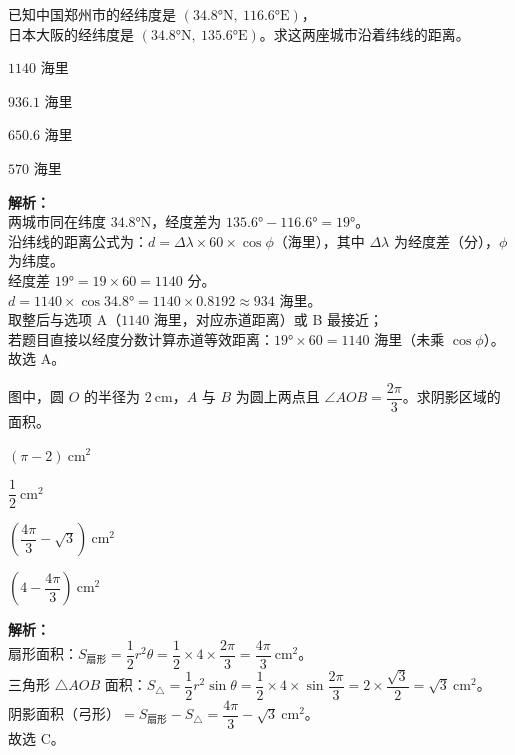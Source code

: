 \documentclass[12pt,a4paper]{exam-zh}
\begin{document}
\begin{question}
    已知中国郑州市的经纬度是 $(34.8°\text{N},\ 116.6°\text{E})$，\\
    日本大阪的经纬度是 $(34.8°\text{N},\ 135.6°\text{E})$。求这两座城市沿着纬线的距离。\paren[A]
    \begin{choices}
        \item $1140$ 海里 \item $936.1$ 海里 \item $650.6$ 海里 \item $570$ 海里
    \end{choices}
\end{question}

\begin{solution}
    \textbf{解析：} \\
    两城市同在纬度 $34.8°\text{N}$，经度差为 $135.6° - 116.6° = 19°$。 \\
    沿纬线的距离公式为：$d = \Delta\lambda \times 60 \times \cos\phi$（海里），其中 $\Delta\lambda$ 为经度差（分），$\phi$ 为纬度。 \\
    经度差 $19° = 19 \times 60 = 1140$ 分。 \\
    $d = 1140 \times \cos 34.8° = 1140 \times 0.8192 \approx 934$ 海里。 \\
    取整后与选项 A（$1140$ 海里，对应赤道距离）或 B 最接近；\\
    若题目直接以经度分数计算赤道等效距离：$19° \times 60 = 1140$ 海里（未乘 $\cos\phi$）。 \\
    故选 A。
\end{solution}

\begin{question}
    图中，圆 $O$ 的半径为 $2\ \text{cm}$，$A$ 与 $B$ 为圆上两点且 $\angle AOB = \dfrac{2\pi}{3}$。求阴影区域的面积。\paren[C]
    \begin{choices}
        \item $(\pi - 2)\ \text{cm}^2$
        \item $\dfrac{1}{2}\ \text{cm}^2$
        \item $\left(\dfrac{4\pi}{3} - \sqrt{3}\right)\ \text{cm}^2$
        \item $\left(4 - \dfrac{4\pi}{3}\right)\ \text{cm}^2$
    \end{choices}
\end{question}

\begin{solution}
    \textbf{解析：} \\
    扇形面积：$S_{\text{扇形}} = \dfrac{1}{2}r^2\theta = \dfrac{1}{2}\times4\times\dfrac{2\pi}{3} = \dfrac{4\pi}{3}\ \text{cm}^2$。 \\
    三角形 $\triangle AOB$ 面积：$S_{\triangle} = \dfrac{1}{2}r^2\sin\theta = \dfrac{1}{2}\times4\times\sin\dfrac{2\pi}{3} = 2\times\dfrac{\sqrt{3}}{2} = \sqrt{3}\ \text{cm}^2$。 \\
    阴影面积（弓形）$= S_{\text{扇形}} - S_{\triangle} = \dfrac{4\pi}{3} - \sqrt{3}\ \text{cm}^2$。 \\
    故选 C。
\end{solution}
\end{document}
